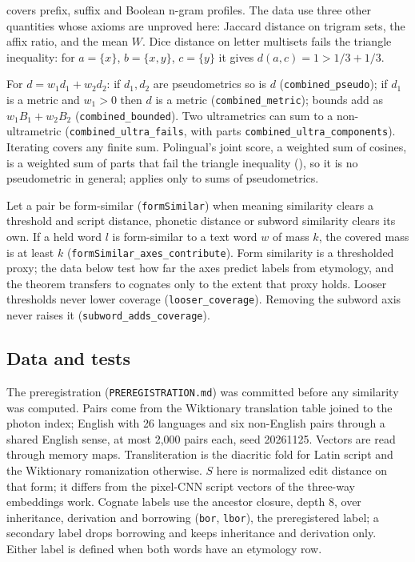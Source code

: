 \documentclass[11pt]{article}
\begin{document}
 covers prefix, suffix and Boolean n-gram profiles. The data use three other quantities whose axioms are unproved here: Jaccard distance on trigram sets, the affix ratio, and the mean $W$. Dice distance on letter multisets fails the triangle inequality: for $a=\{x\}$, $b=\{x,y\}$, $c=\{y\}$ it gives $d(a,c)=1>1/3+1/3$.

\begin{theorem}
\label{thm:combined}
For $d=w_1d_1+w_2d_2$: if $d_1,d_2$ are pseudometrics so is $d$ (\texttt{combined\_pseudo}); if $d_1$ is a metric and $w_1>0$ then $d$ is a metric (\texttt{combined\_metric}); bounds add as $w_1B_1+w_2B_2$ (\texttt{combined\_bounded}). Two ultrametrics can sum to a non-ultrametric (\texttt{combined\_ultra\_fails}, with parts \texttt{combined\_ultra\_components}). Iterating covers any finite sum. Polingual's joint score, a weighted sum of cosines, is a weighted sum of parts that fail the triangle inequality (), so it is no pseudometric in general;  applies only to sums of pseudometrics.
\end{theorem}

\begin{theorem}
\label{thm:cognate}
Let a pair be form-similar (\texttt{formSimilar}) when meaning similarity clears a threshold and script distance, phonetic distance or subword similarity clears its own. If a held word $l$ is form-similar to a text word $w$ of mass $k$, the covered mass is at least $k$ (\texttt{formSimilar\_axes\_contribute}). Form similarity is a thresholded proxy; the data below test how far the axes predict  labels from etymology, and the theorem transfers to cognates only to the extent that proxy holds. Looser thresholds never lower coverage (\texttt{looser\_coverage}). Removing the subword axis never raises it (\texttt{subword\_adds\_coverage}).
\end{theorem}

\subsection{Data and tests}

The preregistration (\texttt{PREREGISTRATION.md}) was committed before any similarity was computed. Pairs come from the Wiktionary translation table joined to the photon index; English with 26 languages and six non-English pairs through a shared English sense, at most 2,000 pairs each, seed 20261125. Vectors are read through memory maps. Transliteration is the diacritic fold for Latin script and the Wiktionary romanization otherwise. $S$ here is normalized edit distance on that form; it differs from the pixel-CNN script vectors of the three-way embeddings work. Cognate labels use the ancestor closure, depth 8, over inheritance, derivation and borrowing (\texttt{bor}, \texttt{lbor}), the preregistered label; a secondary label drops borrowing and keeps inheritance and derivation only. Either label is defined when both words have an etymology row.
\end{document}
